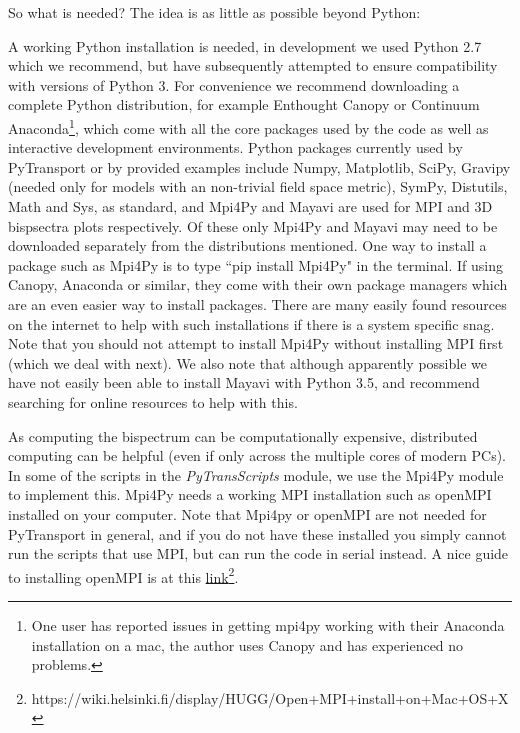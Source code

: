 \documentclass[10pt,
amsmath,amssymb,
aps,prd,nofootinbib,eqsecnum,a4paper]{revtex4}
\begin{document}
\noindent  So what is needed? The idea is as little as possible beyond Python:

\vspace{0.2cm}
  A working Python installation is needed, in development we used Python 2.7 which we recommend, 
but have subsequently attempted to ensure compatibility with versions of Python 3. 
For convenience we recommend downloading a complete Python distribution, for  
  example Enthought Canopy or Continuum Anaconda\footnote{One user has reported issues in getting mpi4py working with 
  their Anaconda installation on a mac, the author uses Canopy and has experienced no problems.}, which 
  come with all the core packages used by the code as well as 
  interactive development environments.
  Python packages currently used by PyTransport or by provided examples include Numpy, Matplotlib, SciPy, 
  Gravipy (needed only for 
  models with an non-trivial field space metric), SymPy, Distutils, Math and Sys, 
  as standard, and Mpi4Py and Mayavi are used 
  for MPI and 3D bispsectra plots respectively. Of these only Mpi4Py and Mayavi may 
  need to be downloaded separately from the distributions mentioned. One way to install a package 
  such as Mpi4Py is to type 
 ``pip install Mpi4Py" in the terminal. If using Canopy, Anaconda or similar, they come with their 
 own package managers  which are an even easier way to install packages. 
 There are many 
 easily found resources on the internet to help with such installations if there is a system 
 specific snag. Note that you should not attempt to install Mpi4Py without installing MPI first (which we deal with next). We also note that although apparently possible we have not easily been able to install Mayavi with Python 3.5, and recommend searching for online resources to help with this.

\vspace{0.2cm}
As computing the bispectrum can be computationally expensive, distributed computing can be helpful 
(even if only across the multiple cores of modern PCs). 
In some of the scripts in the 
{\it PyTransScripts} module,  
we use the Mpi4Py module to implement this. Mpi4Py needs a working MPI installation such as 
openMPI installed on your 
computer. Note that Mpi4py or openMPI are not needed for 
PyTransport in general, and if you do not have these installed you simply  
cannot run the scripts that use MPI, but can run the code in serial instead. A nice guide to installing openMPI is 
at this \href{https://wiki.helsinki.fi/display/HUGG/Open+MPI+install+on+Mac+OS+X}{link}\footnote{https://wiki.helsinki.fi/display/HUGG/Open+MPI+install+on+Mac+OS+X}.
\end{document}
